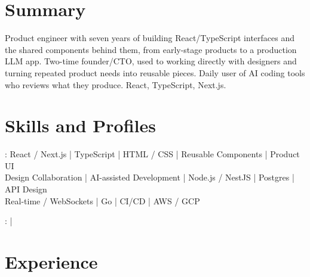 \documentclass[print]{jack-resume}
\begin{document}
\pagecolor{darkmodeBackground}


\begin{minipage}[t][1cm][t]{.03\textwidth}
    \hfill
\end{minipage}

\section{Summary}
Product engineer with seven years of building React/TypeScript interfaces and the shared components behind them, from early-stage products to a production LLM app. Two-time founder/CTO, used to working directly with designers and turning repeated product needs into reusable pieces. Daily user of AI coding tools who reviews what they produce. React, TypeScript, Next.js.
\sectionsep

\section{Skills and Profiles}
:
React / Next.js \hfill | \hfill
TypeScript \hfill | \hfill
HTML / CSS \hfill | \hfill
Reusable Components \hfill | \hfill
Product UI \\
\hspace{1.0cm} Design Collaboration \hfill | \hfill
AI-assisted Development \hfill | \hfill
Node.js / NestJS \hfill | \hfill
Postgres \hfill | \hfill
API Design \\
\hspace{1.0cm} Real-time / WebSockets \hfill | \hfill
Go \hfill | \hfill
CI/CD \hfill | \hfill
AWS / GCP \\

\raggedright{
    :
      \href{https://www.linkedin.com/in/jack-sturtevant/}{ \ExternalLink} |
     \href{https://github.com/jacksturt}{ \ExternalLink}}

\section{Experience}
\end{document}
